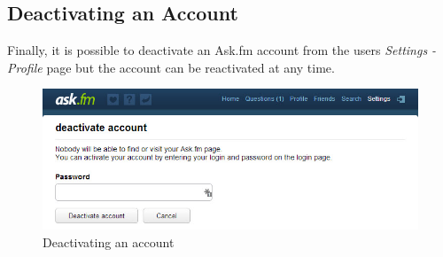 \subsection{Deactivating an Account}
Finally, it is possible to deactivate an Ask.fm account from the users \textit{Settings - Profile} page but the account can be reactivated at any time.

\begin{figure}[h!]
	\centering
	\includegraphics[scale=0.5]{Figures/Chapter2/Deactivate.jpg}
	\caption{Deactivating an account}
	\label{fig:deactivate}
\end{figure}